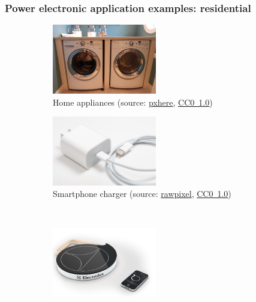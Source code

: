\begin{frame}[c]
	\frametitle{Power electronic application examples: residential}
	\begin{figure}
		\centering
		\begin{subfigure}[b]{0.49\textwidth}
			\centering
			\includegraphics[width=0.5\textwidth]{fig/lec01/Home_appliance.jpg}
			\caption{Home appliances (source: \href{https://pxhere.com/de/photo/863012}{pxhere}, \href{https://creativecommons.org/publicdomain/zero/1.0/}{CC0~1.0})}
		\end{subfigure}
		\hfill
		\begin{subfigure}[b]{0.49\textwidth}
			\centering
			\includegraphics[width=0.5\textwidth]{fig/lec01/Smartphone_charger.jpg}
			\caption{Smartphone charger (source: \href{https://www.rawpixel.com/image/5923136/photo-image-phone-public-domain-white}{rawpixel}, \href{https://creativecommons.org/publicdomain/zero/1.0/}{CC0~1.0})}
		\end{subfigure}
		\\
		\begin{subfigure}[b]{0.49\textwidth}
			\centering
			\includegraphics[width=0.5\textwidth]{fig/lec01/Induction_plate.jpg}

\end{subfigure}
\end{figure}
\end{frame}
